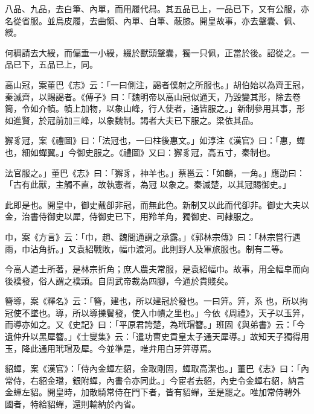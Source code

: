 \begin{pinyinscope}
 八品、九品，去白筆、內單，而用履代舄。其五品已上，一品已下，又有公服，亦名從省服。並烏皮履，去曲領、內單、白筆、蔽膝。開皇故事，亦去鞶囊、佩、綬。



 何稠請去大綬，而偏垂一小綬，綴於獸頭鞶囊，獨一只佩，正當於後。詔從之。一品已下，五品已上，同。



 高山冠，案董巴《志》云：「一曰側注，謁者僕射之所服也。」胡伯始以為齊王冠，秦滅齊，以賜謁者。《傅子》曰：「魏明帝以高山冠似通天，乃毀變其形，除去卷筒，令如介幘。幘上加物，以象山峰，行人使者，通皆服之。」新制參用其事，形如進賢，於冠前加三峰，以象魏制。謁者大夫已下服之。梁依其品。



 獬豸冠，案《禮圖》曰：「法冠也，一曰柱後惠文。」如淳注《漢官》曰：「惠，蟬也，細如蟬翼。」今御史服之。《禮圖》又曰：獬豸冠，高五寸，秦制也。



 法官服之。」董巴《志》曰：「獬豸，神羊也。」蔡邕云：「如麟，一角。」應劭曰：「古有此獸，主觸不直，故執憲者，為冠
 以象之。秦滅楚，以其冠賜御史。」



 此即是也。開皇中，御史戴卻非冠，而無此色。新制又以此而代卻非。御史大夫以金，治書侍御史以犀，侍御史已下，用羚羊角，獨御史、司隸服之。



 巾，案《方言》云：「巾，趙、魏間通謂之承露。」《郭林宗傳》曰：「林宗嘗行遇雨，巾沾角折。」又袁紹戰敗，幅巾渡河。此則野人及軍旅服也。制有二等。



 今高人道士所著，是林宗折角；庶人農夫常服，是袁紹幅巾。故事，用全幅皁而向後襆發，俗人謂之襆頭。自周武帝裁為四腳，今通於貴賤矣。



 簪導，案《釋名》云：「簪，建也，所以建冠於發也。一曰笄。笄，系
 也，所以拘冠使不墜也。導，所以導擽鬢發，使入巾幘之里也。」今依《周禮》，天子以玉笄，而導亦如之。又《史記》曰：「平原君誇楚，為玳瑁簪。」班固《與弟書》云：「今遺仲升以黑犀簪。」《士燮集》云：「遣功曹史貢皇太子通天犀導。」故知天子獨得用玉，降此通用玳瑁及犀。今並準是，唯弁用白牙笄導焉。



 貂蟬，案《漢官》：「侍內金蟬左貂，金取剛固，蟬取高潔也。」董巴《志》曰：「內常侍，右貂金璫，銀附蟬，內書令亦同此。」今宦者去貂，內史令金蟬右貂，納言金蟬左貂。開皇時，加散騎常侍在門下者，皆有貂蟬，至是罷之。唯加常侍聘外
 國者，特給貂蟬，還則輸納於內省。




\end{pinyinscope}
